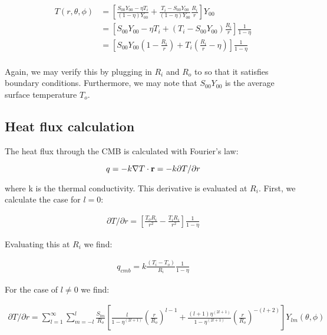 \documentclass[a4paper,10pt]{article}
\begin{document}
\begin{equation}
\begin{aligned}
T(r, \theta, \phi) &= \left[ \frac{S_{00}Y_{00} - \eta T_i}{(1-\eta)Y_{00}} + \frac{T_i - S_{00}Y_{00}}{(1-\eta)Y_{00}} \frac{R_i}{r} \right] Y_{00} \\
&= \left[ S_{00}Y_{00} - \eta T_i + (T_i - S_{00}Y_{00}) \frac{R_i}{r} \right] \frac{1}{1-\eta} \\
&= \left[ S_{00} Y_{00}(1-\frac{R_i}{r}) + T_i ( \frac{R_i}{r} - \eta ) \right] \frac{1}{1-\eta} \\
\end{aligned}
\end{equation}

Again, we may verify this by plugging in $R_i$ and $R_o$ to so that it satisfies boundary conditions.
Furthermore, we may note that $S_{00}Y_{00}$ is the average surface temperature $T_o$.

\subsection{Heat flux calculation}

The heat flux through the CMB is calculated with Fourier's law:

\begin{equation}
q = -k \nabla T \cdot {\bf{r}} = -k \partial T / \partial r
\end{equation}

where k is the thermal conductivity.  This derivative is evaluated at $R_i$.  First, we calculate the case for $l=0$:

\begin{equation}
\begin{aligned}
\partial T/ \partial r = \left[ \frac{ T_o R_i }{r^2} - \frac{T_i R_i}{r^2} \right] \frac{1}{1-\eta}
\end{aligned}
\end{equation}

Evaluating this at $R_i$ we find:

\begin{equation}
\begin{aligned}
q_{cmb} = k \frac{(T_i - T_o)}{R_i} \frac{1}{1-\eta}
\end{aligned}
\end{equation}

For the case of $l \ne 0$ we find:

\begin{equation}
\begin{aligned}
\partial T / \partial r = \displaystyle \sum_{l=1}^{\infty} \sum_{m=-l}^{l} \frac{S_{lm}}{R_o} \left[ \frac{l}{1-\eta^{(2l+1)}} \left(\frac{r}{R_o}\right)^{l-1} +  \frac{(l+1) \eta^{(2l+1)}}{1-\eta^{(2l+1)}} \left(\frac{r}{R_o}\right)^{-(l+2)} \right] Y_{lm}(\theta,\phi)
\end{aligned}
\end{equation}
\end{document}
